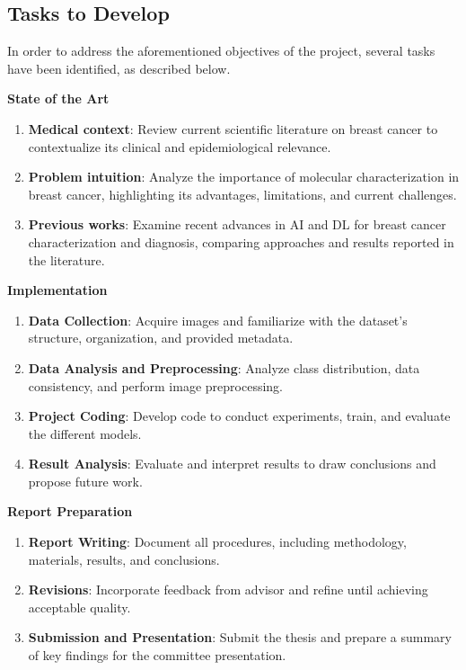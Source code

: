 \documentclass[a4paper,10pt]{book}
\begin{document}
\subsection{Tasks to Develop}

In order to address the aforementioned objectives of the project, several tasks have been identified, as described below. 

\textbf{State of the Art}

\begin{enumerate}
	\item \textbf{Medical context}: Review current scientific literature on breast cancer to contextualize its clinical and epidemiological relevance.
	\item \textbf{Problem intuition}: Analyze the importance of molecular characterization in breast cancer, highlighting its advantages, limitations, and current challenges.
	\item \textbf{Previous works}: Examine recent advances in AI and DL for breast cancer characterization and diagnosis, comparing approaches and results reported in the literature.
\end{enumerate}

\textbf{Implementation}

\begin{enumerate}
	\item \textbf{Data Collection}: Acquire images and familiarize with the dataset's structure, organization, and provided metadata.
	\item \textbf{Data Analysis and Preprocessing}: Analyze class distribution, data consistency, and perform image preprocessing.
	\item \textbf{Project Coding}: Develop code to conduct experiments, train, and evaluate the different models.
	\item \textbf{Result Analysis}: Evaluate and interpret results to draw conclusions and propose future work.
\end{enumerate}

\textbf{Report Preparation}

\begin{enumerate}
	\item \textbf{Report Writing}: Document all procedures, including methodology, materials, results, and conclusions.
	\item \textbf{Revisions}: Incorporate feedback from advisor and refine until achieving acceptable quality.
	\item \textbf{Submission and Presentation}: Submit the thesis and prepare a summary of key findings for the committee presentation.
\end{enumerate}
\end{document}
